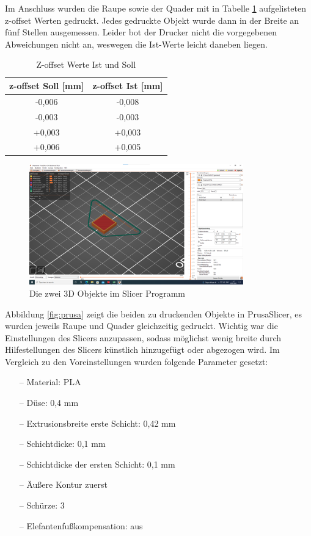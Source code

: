 \documentclass[a4paper,12pt,bibtotocnumbered]{scrartcl}
\numberwithin{equation}{section} %
\begin{document}
Im Anschluss wurden die Raupe sowie der Quader mit in Tabelle \ref*{tab:z-offset} aufgelisteten z-offset Werten gedruckt. Jedes gedruckte Objekt wurde dann in der Breite an fünf Stellen ausgemessen. Leider bot der Drucker nicht die vorgegebenen Abweichungen nicht an, weswegen die Ist-Werte leicht daneben liegen.  

\bgroup
\def\arraystretch{1.6}%
\begin{table}[H]
\centering
\label{tab:z-offset}
\begin{tabular}{|c|c|}
\hline
z-offset Soll {[}mm{]} & z-offset Ist {[}mm{]} \\ \hline
-0,006                 & -0,008                \\ \hline
-0,003                 & -0,003                \\ \hline
+0,003                 & +0,003                \\ \hline
+0,006                 & +0,005                \\ \hline
\end{tabular}
\caption{Z-offset Werte Ist und Soll}
\end{table}
\egroup


\begin{figure}[H]
	\centerline{\includegraphics[width=350px]{./images/prusaSlicer.png}}
	\caption{Die zwei 3D Objekte im Slicer Programm}
	\label{prusa}
	\end{figure}

Abbildung \ref*{fig:prusa} zeigt die beiden zu druckenden Objekte in PrusaSlicer, es wurden jeweils Raupe und Quader gleichzeitig gedruckt. Wichtig war die Einstellungen des Slicers anzupassen, sodass möglichst wenig breite durch Hilfestellungen des Slicers künstlich hinzugefügt oder abgezogen wird. Im Vergleich zu den Voreinstellungen wurden folgende Parameter gesetzt:
\begin{itemize}
	\item[--] Material: PLA
	\item[--] Düse: 0,4 mm
	\item[--] Extrusionsbreite erste Schicht: 0,42 mm
	\item[--] Schichtdicke: 0,1 mm
	\item[--] Schichtdicke der ersten Schicht: 0,1 mm
	\item[--] Äußere Kontur zuerst
	\item[--] Schürze: 3
	\item[--] Elefantenfußkompensation: aus
\end{itemize}
\end{document}
